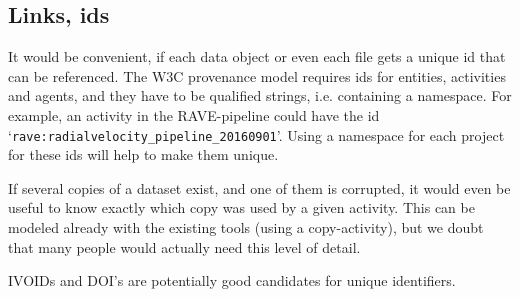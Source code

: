 \subsection{Links, ids}\label{sec:links_between_data}
It would be convenient, if each data object or even each file 
gets a unique id that can be referenced. The W3C provenance model requires ids
for entities, activities and agents, and they have to be qualified strings, 
i.e. containing a namespace. For example, an activity in the RAVE-pipeline could 
have the id `\texttt{rave:radialvelocity\_pipeline\_20160901}'. Using a namespace for each 
project for these ids will help to make them unique. 

If several copies of a dataset exist, and one of them is corrupted, it would even be useful to know
exactly which copy was used by a given activity. This can be modeled already 
with the existing tools (using a copy-activity), but we doubt that many people
would actually need this level of detail.

IVOIDs and DOI's are potentially good candidates for unique identifiers.






